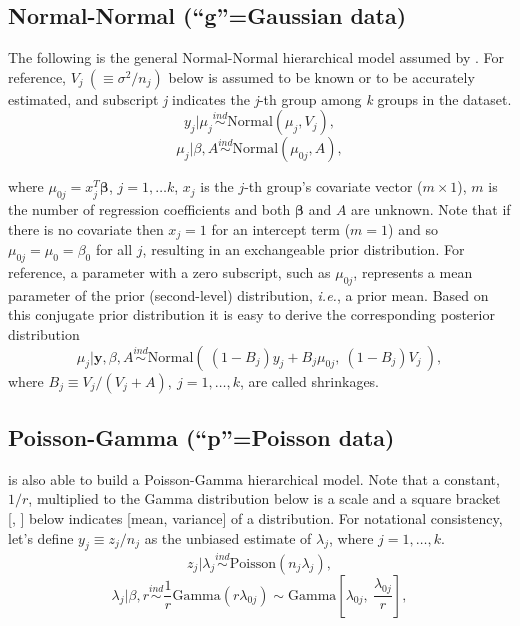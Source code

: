 \documentclass[article]{jss}
\begin{document}
\subsection[Normal-Normal]{Normal-Normal (``g''=Gaussian data)}
The following is the general Normal-Normal hierarchical model assumed by . For reference,  $V_{j}~(\equiv \sigma^{2}/n_{j})$ below is assumed to be known or to be accurately estimated, and subscript \emph{j} indicates the \emph{j}-th group among \emph{k} groups in the dataset.
\begin{equation}\label{normalobs}
y_{j}\vert \mu_{j} \stackrel{ind}{\sim}\textrm{Normal}(\mu_{j}, V_{j}),
\end{equation}
\begin{equation}\label{normalprior}
\mu_{j}\vert \beta, A\stackrel{ind}{\sim}\textrm{Normal}(\mu_{0j}, A),
\end{equation}

where $\mu_{0j} = x^{T}_{j} \mathbf{\beta}$, $j=1, \ldots k$, $x_{j}$ is the $j$-th group's covariate vector ($m\times 1$), $m$ is the number of regression coefficients and both $\mathbf{\beta}$ and $A$ are unknown. Note that if there is no covariate then $x_{j}=1$ for an intercept term ($m=1$) and so $\mu_{0j}=\mu_{0}=\beta_{0}$ for all $j$, resulting in an exchangeable prior distribution. For reference, a parameter with a zero subscript, such as $\mu_{0j}$, represents a mean parameter of the prior (second-level) distribution, \emph{i.e.}, a prior mean. Based on this conjugate prior distribution it is easy to derive the corresponding posterior distribution
\begin{equation} \label{normalpost}
\mu_{j}\vert \textbf{y}, \beta, A \stackrel{ind}{\sim}\textrm{Normal}(~(1-B_{j})y_{j} + B_{j}\mu_{0j},~(1-B_{j})V_{j}~),
\end{equation}
where $B_{j}\equiv V_{j}/(V_{j} + A),~j=1, \ldots, k$, are called shrinkages.

\subsection[Poisson-Gamma]{Poisson-Gamma (``p''=Poisson data)}
 is also able to build a Poisson-Gamma hierarchical model. Note that a constant, $1/r$, multiplied to the Gamma distribution below is a scale and a square bracket [, ] below indicates [mean, variance] of a distribution. For notational consistency, let's define $y_{j}\equiv z_{j} / n_{j}$ as the unbiased estimate of $\lambda_{j}$, where $j=1, \ldots, k$.
\begin{equation}
z_{j}\vert \lambda_{j} \stackrel{ind}{\sim}\textrm{Poisson}(n_{j}\lambda_{j}),
\end{equation}
\begin{equation}\label{gammaprior}
\lambda_{j}\vert \beta, r\stackrel{ind}{\sim}\frac{1}{r}\textrm{Gamma}(r\lambda_{0j})\sim \textrm{Gamma} \left[\lambda_{0j}, ~\frac{\lambda_{0j}}{r} \right],
\end{equation}
\end{document}
